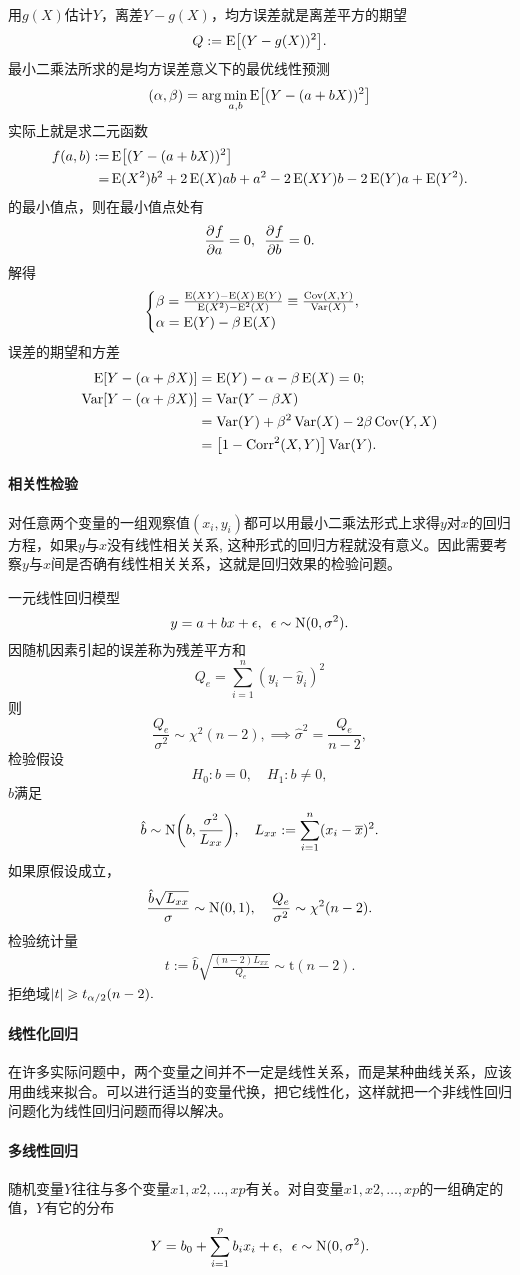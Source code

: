 用$g(X)$估计$Y$，离差$Y-g(X)$，均方误差就是离差平方的期望
\[
	Q:=\operatorname{E}\bigl[(Y-g(X))^2\bigr].
\]
最小二乘法所求的是均方误差意义下的最优线性预测
\[
	(\alpha,\beta)=\arg\min_{a,b}\operatorname{E}\bigl[(Y-(a+bX))^2\bigr]
\]
实际上就是求二元函数
\begin{align*}
	f(a,b):=&{}\operatorname{E}\bigl[(Y-(a+bX))^2\bigr]\\
	=&{}\operatorname{E}(X^2)b^2+2\operatorname{E}(X)ab+a^2-2\operatorname{E}(XY)b-2\operatorname{E}(Y)a+\operatorname{E}(Y^2).
\end{align*}
的最小值点，则在最小值点处有
\[
	\frac{\partial^{{}}f}{\partial{a}^{{}}}=0,\enspace\frac{\partial^{{}}f}{\partial{b}^{{}}}=0.
\]
解得
\begin{align}
	\begin{cases}
		\beta=\frac{\operatorname{E}(XY)-\operatorname{E}(X)\operatorname{E}(Y)}{\operatorname{E}(X^2)-\operatorname{E}^2(X)}\equiv\frac{\operatorname{Cov}(X,Y)}{\operatorname{Var}(X)},\\
		\alpha=\operatorname{E}(Y)-\beta\operatorname{E}(X)
	\end{cases}
\end{align}
误差的期望和方差
\begin{align*}
	\E[Y-(\alpha+\beta X)]&=\E(Y)-\alpha-\beta\E(X)=0;\\
	\Var[Y-(\alpha+\beta X)]&=\Var(Y-\beta X)\\
	&=\Var(Y)+\beta^2\Var(X)-2\beta\Cov(Y,X)\\
	&=%
	\bigfkh{1-\Corr^2(X,Y)}\Var(Y).
\end{align*}
\paragraph{相关性检验}
对任意两个变量的一组观察值$ {(x_i, y_i)} $都可以用最小二乘法形式上求得$ y$对$ x $的回归方程，如果$ y $与$ x $没有线性相关关系, 这种形式的回归方程就没有意义。因此需要考察$ y $与$ x $间是否确有线性相关关系，这就是回归效果的检验问题。

一元线性回归模型
\[
	y=a+bx+\epsilon,\enspace\epsilon\sim\operatorname{N}(0,\sigma^2).
\]
因随机因素引起的误差称为残差平方和
\[
	Q_e=\sum_{i=1}^n(y_i-\hat y_i)^2
\]
则
\[
	\frac{Q_e}{\sigma^2}\sim\chi^2(n-2),\implies\hat\sigma^2=\frac{Q_e}{n-2},
\]
检验假设 
\[
	H_0:b=0,\quad H_1:b\neq 0,
\]
$\hat b$满足 
\[
	\hat b\sim\operatorname{N}\biggl(b,\frac{\sigma^2}{L_{xx}}\biggr),\quad L_{xx}:=\sum_{i=1}^n(x_i-\overline{x})^2.
\]
如果原假设成立，
\[
	\frac{\hat b\sqrt{L_{xx}}}{\sigma}\sim\operatorname{N}(0,1),\quad\frac{Q_e}{\sigma^2}\sim\chi^2(n-2).
\]
检验统计量 
\begin{align}
	t:=\hat b\sqrt{\frac{(n-2)L_{xx}}{Q_e}}\sim\mathrm t(n-2).
\end{align}
拒绝域$\left\lvert t\right\rvert\geqslant t_{\alpha/2}(n-2).$
\paragraph{线性化回归}
在许多实际问题中，两个变量之间并不一定是线性关系，而是某种曲线关系，应该用曲线来拟合。可以进行适当的变量代换，把它线性化，这样就把一个非线性回归问题化为线性回归问题而得以解决。
\paragraph{多线性回归}
随机变量$ Y $往往与多个变量$ x1, x2, \ldots , xp $有关。对自变量$ x1, x2, \ldots, xp $的一组确定的值，$Y $有它的分布
\[
	Y=b_0+\sum_{i=1}^pb_ix_i+\epsilon,\enspace\epsilon\sim\operatorname{N}(0,\sigma^2).
\]